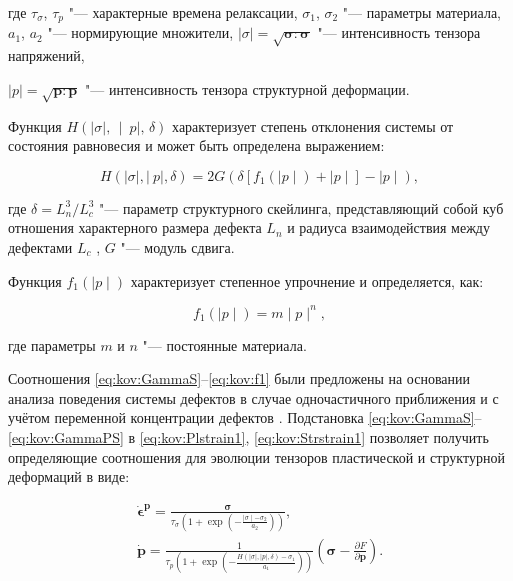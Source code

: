 где $\tau_{\sigma}$, $\tau_{p}$ "--- характерные времена релаксации, $\sigma_{1}$, $\sigma_{2}$ "---  параметры материала, $a_{1}$, $a_{2}$ "---  нормирующие множители, $\mid\sigma\mid=\sqrt{\boldsymbol{\sigma}:\boldsymbol{\sigma}}$ "--- интенсивность тензора напряжений,

$\mid p \mid=\sqrt{\boldsymbol{p}:\boldsymbol{p}}$ "--- интенсивность тензора структурной деформации.





Функция $H(\mid\sigma\mid,\,\mid\ p\mid,\,\delta)$ характеризует степень отклонения системы от состояния равновесия  и может быть определена выражением:

\begin{equation}

H(\mid\sigma\mid,\mid\ p\mid,\delta)=2G(\delta[f_{1}(\mid p \mid)+\mid p \mid]-\mid p \mid), \label{eq:kov:H}

\end{equation}

где $\delta=L^{3}_{n}/L^{3}_{c}$ "---  параметр структурного скейлинга, представляющий собой куб отношения характерного размера дефекта $L_{n}$ и радиуса взаимодействия между дефектами $L_{c}$ \cite{kostina:bib:NaimarkP}, $G$ "--- модуль сдвига.

Функция $f_{1}(\mid p \mid)$ характеризует степенное упрочнение и определяется, как:

\begin{equation}

f_{1}(\mid p \mid)=m\mid p \mid^n, \label{eq:kov:f1}

\end{equation}

где параметры $m$ и $n$ "--- постоянные материала.



Соотношения \eqref{eq:kov:GammaS}--\eqref{eq:kov:f1} были предложены на основании анализа поведения системы дефектов в случае одночастичного приближения  \cite{kostina:bib:NaimarkP} и с учётом переменной концентрации дефектов \cite{kostina:bib:Plekhov}.  Подстановка \eqref{eq:kov:GammaS}--\eqref{eq:kov:GammaPS} в \eqref{eq:kov:Plstrain1}, \eqref{eq:kov:Strstrain1} позволяет получить определяющие соотношения для эволюции тензоров пластической и структурной деформаций в виде:

\begin{gather}

\boldsymbol{\dot{\epsilon}^{p}}= \frac{\boldsymbol{\sigma}}{\tau_{\sigma}\left(1+\exp{\left(-\frac{\mid\sigma\mid-\sigma_{2}}{a_{2}}\right)}\right)}, \label{eq:kov:Plstrain2}\\

\dot{\boldsymbol{p}}=\frac{1}{\tau_{p}\left(1+\exp{\left(-\frac{H(\mid\sigma\mid,\mid p \mid,\delta)-\sigma_{1}}{a_{1}}\right)}\right)}\left(\boldsymbol{\sigma}-\frac{\partial F}{\partial{\boldsymbol{p}}}\right). \label{eq:kov:Strstrain2}

\end{gather}

